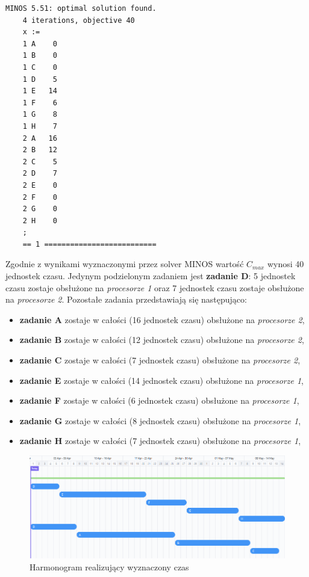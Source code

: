 \documentclass[
    12pt, %
]{../fphw}
\begin{document}
\begin{lstlisting}[caption=Rozwiązanie znalezione solwerem minos]
    MINOS 5.51: optimal solution found.
    4 iterations, objective 40
    x :=
    1 A    0
    1 B    0
    1 C    0
    1 D    5
    1 E   14
    1 F    6
    1 G    8
    1 H    7
    2 A   16
    2 B   12
    2 C    5
    2 D    7
    2 E    0
    2 F    0
    2 G    0
    2 H    0
    ;
    == 1 ==========================
\end{lstlisting}
Zgodnie z wynikami wyznaczonymi przez solver MINOS wartość \(C_{max}\) wynosi 40 jednostek czasu.
Jedynym podzielonym zadaniem jest \textbf{zadanie D}: 5 jednostek czasu zostaje obsłużone na \textit{procesorze 1}
oraz 7 jednostek czasu zostaje obsłużone na \textit{procesorze 2}.
Pozostałe zadania przedstawiają się następująco:
\begin{itemize}
    \item \textbf{zadanie A} zostaje w całości (16 jednostek czasu) obsłużone na \textit{procesorze 2},
    \item \textbf{zadanie B} zostaje w całości (12 jednostek czasu) obsłużone na \textit{procesorze 2},
    \item \textbf{zadanie C} zostaje w całości (7 jednostek czasu) obsłużone na \textit{procesorze 2},
    \item \textbf{zadanie E} zostaje w całości (14 jednostek czasu) obsłużone na \textit{procesorze 1},
    \item \textbf{zadanie F} zostaje w całości (6 jednostek czasu) obsłużone na \textit{procesorze 1},
    \item \textbf{zadanie G} zostaje w całości (8 jednostek czasu) obsłużone na \textit{procesorze 1},
    \item \textbf{zadanie H} zostaje w całości (7 jednostek czasu) obsłużone na \textit{procesorze 1},
\end{itemize}


\begin{figure}[H]
    \centering
    \includegraphics[width=\linewidth]{./img/harmonogram-1.PNG}
    \caption{Harmonogram realizujący wyznaczony czas}
    \label{fig:harmonogram-1}
\end{figure}
\end{document}
